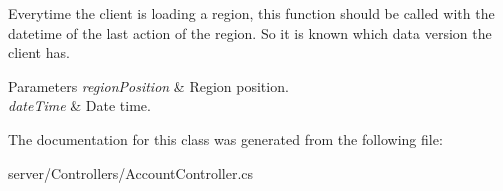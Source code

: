 Everytime the client is loading a region, this function should be called with the datetime of the last action of the region. So it is known which data version the client has. 


\begin{DoxyParams}{Parameters}
{\em region\-Position} & Region position.\\
\hline
{\em date\-Time} & Date time.\\
\hline
\end{DoxyParams}


The documentation for this class was generated from the following file\-:\begin{DoxyCompactItemize}
\item 
server/\-Controllers/Account\-Controller.\-cs\end{DoxyCompactItemize}
